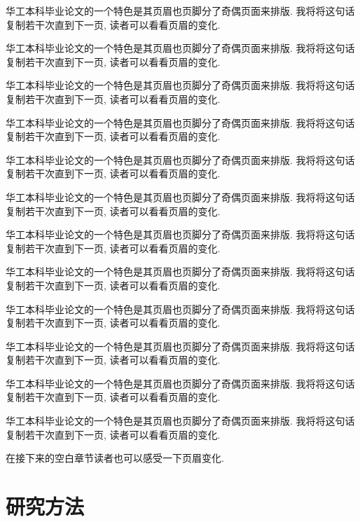 \documentclass{scutbthesis}
\begin{document}
华工本科毕业论文的一个特色是其页眉也页脚分了奇偶页面来排版. 我将将这句话复制若干次直到下一页, 读者可以看看页眉的变化.

华工本科毕业论文的一个特色是其页眉也页脚分了奇偶页面来排版. 我将将这句话复制若干次直到下一页, 读者可以看看页眉的变化.

华工本科毕业论文的一个特色是其页眉也页脚分了奇偶页面来排版. 我将将这句话复制若干次直到下一页, 读者可以看看页眉的变化.

华工本科毕业论文的一个特色是其页眉也页脚分了奇偶页面来排版. 我将将这句话复制若干次直到下一页, 读者可以看看页眉的变化.

华工本科毕业论文的一个特色是其页眉也页脚分了奇偶页面来排版. 我将将这句话复制若干次直到下一页, 读者可以看看页眉的变化.

华工本科毕业论文的一个特色是其页眉也页脚分了奇偶页面来排版. 我将将这句话复制若干次直到下一页, 读者可以看看页眉的变化.

华工本科毕业论文的一个特色是其页眉也页脚分了奇偶页面来排版. 我将将这句话复制若干次直到下一页, 读者可以看看页眉的变化.

华工本科毕业论文的一个特色是其页眉也页脚分了奇偶页面来排版. 我将将这句话复制若干次直到下一页, 读者可以看看页眉的变化.

华工本科毕业论文的一个特色是其页眉也页脚分了奇偶页面来排版. 我将将这句话复制若干次直到下一页, 读者可以看看页眉的变化.

华工本科毕业论文的一个特色是其页眉也页脚分了奇偶页面来排版. 我将将这句话复制若干次直到下一页, 读者可以看看页眉的变化.

华工本科毕业论文的一个特色是其页眉也页脚分了奇偶页面来排版. 我将将这句话复制若干次直到下一页, 读者可以看看页眉的变化.

华工本科毕业论文的一个特色是其页眉也页脚分了奇偶页面来排版. 我将将这句话复制若干次直到下一页, 读者可以看看页眉的变化.

在接下来的空白章节读者也可以感受一下页眉变化.

\pagebreak[4]

\section{研究方法}

\pagebreak[4]

\end{document}
